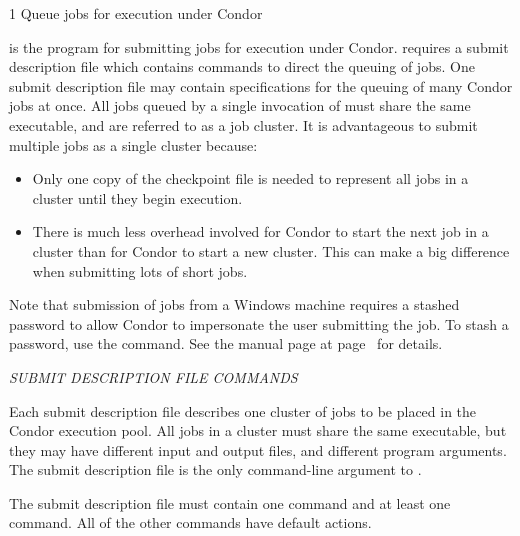 \begin{ManPage}{\label{man-condor-submit}}{1}
{Queue jobs for execution under Condor}
\Synopsis {}
\oOpt{--}
\Lbr{}  \Opt{\Dots}\Rbr 
{}


\Description

 is the program for submitting jobs for execution
under Condor.
 requires a submit description file which contains commands
to direct the queuing of jobs. One submit description file may contain
specifications for the queuing of many Condor jobs at once.
All jobs queued by a
single invocation of  must share the same executable, and
are referred to as a job cluster. It is advantageous to submit
multiple jobs as a single cluster because:
\begin{itemize}
\item Only one copy of the checkpoint file is needed to 
represent all jobs in a cluster until they begin execution.
\item There is much less overhead involved for Condor to start the next
job in a cluster than for Condor to start a new cluster.  This can make
a big difference when submitting lots of short jobs.
\end{itemize}

Note that submission of jobs from a Windows machine requires
a stashed password to allow Condor to impersonate the user submitting
the job.
To stash a password, use the  command.
See the manual page at
page~\pageref{man-condor-store-cred} for details.

\emph{SUBMIT DESCRIPTION FILE COMMANDS}

Each submit description file describes one cluster of jobs to be
placed in the Condor execution pool. All jobs in a cluster must share
the same executable, but they may have different input and output files,
and different program arguments. The submit description file is
the only command-line argument to . 

The submit description file must contain one  command and at least one
 command.  All of the other commands have default actions.


\end{ManPage}
